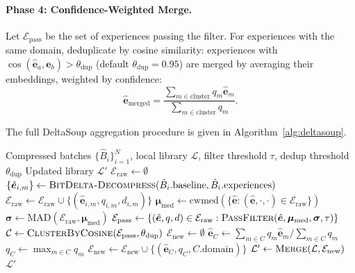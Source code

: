 \documentclass[11pt]{article}
\DeclareMathOperator{\med}{med}
\begin{document}
\paragraph{Phase 4: Confidence-Weighted Merge.}
Let $\mathcal{E}_{\text{pass}}$ be the set of experiences passing the filter.
For experiences with the same domain, deduplicate by cosine similarity:
experiences with $\cos(\hat{\bm{e}}_a, \hat{\bm{e}}_b) > \theta_{\text{dup}}$
(default $\theta_{\text{dup}} = 0.95$) are merged by averaging their
embeddings, weighted by confidence:
\begin{equation}
    \hat{\bm{e}}_{\text{merged}} = \frac{\sum_{m \in \text{cluster}} q_m \hat{\bm{e}}_m}{\sum_{m \in \text{cluster}} q_m}.
    \label{eq:weighted-merge}
\end{equation}

The full DeltaSoup aggregation procedure is given in Algorithm~\ref{alg:deltasoup}.

\begin{algorithm}[H]
\caption{\textsc{DeltaSoup}}
\label{alg:deltasoup}
\begin{algorithmic}[1]
\Require Compressed batches $\{\hat{B}_i\}_{i=1}^N$, local library $\mathcal{L}$,
         filter threshold $\tau$, dedup threshold $\theta_{\text{dup}}$
\Ensure Updated library $\mathcal{L}'$
\State $\mathcal{E}_{\text{raw}} \gets \emptyset$
        \State $\{\hat{\bm{e}}_{i,m}\} \gets \textsc{BitDelta-Decompress}(\hat{B}_i.\text{baseline}, \hat{B}_i.\text{experiences})$
        \State $\mathcal{E}_{\text{raw}} \gets \mathcal{E}_{\text{raw}} \cup \{(\hat{\bm{e}}_{i,m}, q_{i,m}, d_{i,m})\}$
    \EndIf
\EndFor
\State $\bm{\mu}_{\med} \gets \text{cwmed}(\{\hat{\bm{e}} : (\hat{\bm{e}}, \cdot, \cdot) \in \mathcal{E}_{\text{raw}}\})$
\State $\bm{\sigma} \gets \text{MAD}(\mathcal{E}_{\text{raw}}, \bm{\mu}_{\med})$
\State $\mathcal{E}_{\text{pass}} \gets \{(\hat{\bm{e}}, q, d) \in \mathcal{E}_{\text{raw}} : \textsc{PassFilter}(\hat{\bm{e}}, \bm{\mu}_{\med}, \bm{\sigma}, \tau)\}$
\State $\mathcal{C} \gets \textsc{ClusterByCosine}(\mathcal{E}_{\text{pass}}, \theta_{\text{dup}})$
\State $\mathcal{E}_{\text{new}} \gets \emptyset$
    \State $\hat{\bm{e}}_C \gets \sum_{m \in C} q_m \hat{\bm{e}}_m / \sum_{m \in C} q_m$
    \State $q_C \gets \max_{m \in C} q_m$ 
    \State $\mathcal{E}_{\text{new}} \gets \mathcal{E}_{\text{new}} \cup \{(\hat{\bm{e}}_C, q_C, C.\text{domain})\}$
\EndFor
\State $\mathcal{L}' \gets \textsc{Merge}(\mathcal{L}, \mathcal{E}_{\text{new}})$
\State \Return $\mathcal{L}'$
\end{algorithmic}
\end{algorithm}
\end{document}
